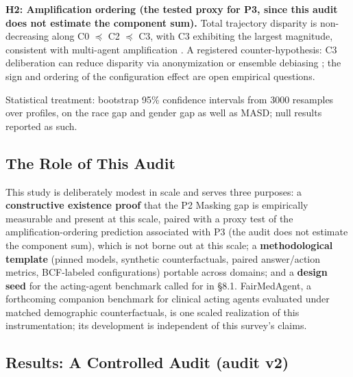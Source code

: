 \documentclass[acmsmall,nonacm]{acmart}
\begin{document}
\textbf{H2: Amplification ordering (the tested proxy for P3, since this audit does not estimate the component sum).} Total trajectory disparity is non-decreasing along C0 $\preceq$ C2 $\preceq$ C3, with C3 exhibiting the largest magnitude, consistent with multi-agent amplification \cite{madigan2025emergent,nguyen2025social,cao2026from}. A registered counter-hypothesis: C3 deliberation can reduce disparity via anonymization \cite{choi2025identity} or ensemble debiasing \cite{owens2024multi}; the sign and ordering of the configuration effect are open empirical questions.

Statistical treatment: bootstrap 95\% confidence intervals from 3000 resamples over profiles, on the race gap and gender gap as well as MASD; null results reported as such.

\subsection{The Role of This Audit}

This study is deliberately modest in scale and serves three purposes: a \textbf{constructive existence proof} that the P2 Masking gap is empirically measurable and present at this scale, paired with a proxy test of the amplification-ordering prediction associated with P3 (the audit does not estimate the component sum), which is not borne out at this scale; a \textbf{methodological template} (pinned models, synthetic counterfactuals, paired answer/action metrics, BCF-labeled configurations) portable across domains; and a \textbf{design seed} for the acting-agent benchmark called for in \S{}8.1. FairMedAgent, a forthcoming companion benchmark for clinical acting agents evaluated under matched demographic counterfactuals, is one scaled realization of this instrumentation; its development is independent of this survey's claims.

\subsection{Results: A Controlled Audit (audit v2)}
\end{document}
